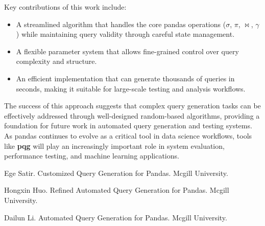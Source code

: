 \documentclass[10pt, twocolumn]{article}
\begin{document}
\spacing
\noindent
Key contributions of this work include:
\begin{itemize}
    \item A streamlined algorithm that handles the core pandas operations ($\sigma$, $\pi$, $\bowtie$, $\gamma$) while maintaining query validity through careful state management.
    \item A flexible parameter system that allows fine-grained control over query complexity and structure.
    \item An efficient implementation that can generate thousands of queries in seconds, making it suitable for large-scale testing and analysis workflows.
\end{itemize}

\spacing
\noindent
The success of this approach suggests that complex query generation tasks can be effectively addressed through well-designed random-based algorithms, providing a foundation for future work in automated query generation and testing systems. As pandas continues to evolve as a critical tool in data science workflows, tools like \textbf{pqg} will play an increasingly important role in system evaluation, performance testing, and machine learning applications.

\renewcommand{\refname}{6 \quad References}

\begin{thebibliography}{99}

Ege Satir. Customized Query Generation for Pandas. Mcgill University.

Hongxin Huo. Refined Automated Query Generation for Pandas. Mcgill University.

Dailun Li. Automated Query Generation for Pandas. Mcgill University.

\end{thebibliography}
\end{document}
